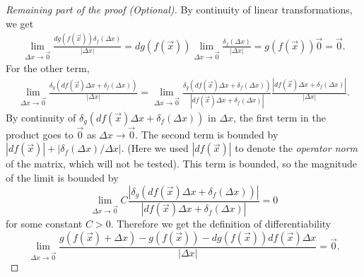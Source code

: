 \begin{proof}[Remaining part of the proof (Optional)]
    By continuity of linear transformations, we get \begin{align*}
        \lim_{\Delta x\to\vec{0}} \frac{ dg(f(\vec{x}))\delta_f(\Delta x)}{|\Delta x|} =dg(f(\vec{x}))  \lim_{\Delta x\to\vec{0}} \frac{ \delta_f(\Delta x)}{|\Delta x|} = g(f(\vec{x})) \vec{0}=\vec{0}.
    \end{align*}
    For the other term, \begin{align*}
        \lim_{\Delta x\to\vec{0}}\frac{\delta_g(df(\vec{x}) \Delta x + \delta_f(\Delta x))}{|\Delta x|} = \lim_{\Delta x\to\vec{0}}\frac{\delta_g(df(\vec{x}) \Delta x + \delta_f(\Delta x))}{|df(\vec{x}) \Delta x + \delta_f(\Delta x)|}\frac{|df(\vec{x}) \Delta x + \delta_f(\Delta x)|}{|\Delta x|}.
    \end{align*}
    By continuity of $\delta_g(df(\vec{x}) \Delta x + \delta_f(\Delta x))$ in $\Delta x$, the first term in the product goes to $\vec{0}$ as $\Delta x\to\vec{0}$. The second term is bounded by $|df(\vec{x})| + |\delta_f(\Delta x)/\Delta x|$. (Here we used $|df(\vec{x})|$ to denote the \textit{operator norm} of the matrix, which will not be tested). This term is bounded, so the magnitude of the limit is bounded by \[
        \lim_{\Delta x\to\vec{0}} C\frac{|\delta_g(df(\vec{x}) \Delta x + \delta_f(\Delta x))|}{|df(\vec{x}) \Delta x + \delta_f(\Delta x)|} = 0
    \]
    for some constant $C>0$. Therefore we get the definition of differentiability  \[
        \lim_{\Delta x\to\vec{0}} \frac{ g(f(\vec{x})+ \Delta x) - g(f(\vec{x}))- dg(f(\vec{x}))df(\vec{x}) \Delta x }{|\Delta x|}=\vec{0}.
    \]
\end{proof}
